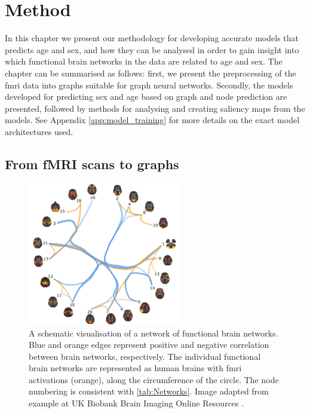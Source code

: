 \chapter{Method}
\label{chap:method}

In this chapter we present our methodology for developing accurate models that predicts age and sex, and how they can be analysed in order to gain insight into which functional brain networks in the data are related to age and sex. The chapter can be summarised as follows: first, we present the preprocessing of the \acrshort{fmri} data into graphs suitable for graph neural networks. Secondly, the models developed for predicting sex and age based on graph and node prediction are presented, followed by methods for analysing and creating saliency maps from the models. See Appendix \ref{app:model_training} for more details on the exact model architectures used. 

\section{From fMRI scans to graphs}\label{sec:fmri_to_graphs}

\begin{figure}[!htbp]
    \centering
    \includegraphics[width=0.6\textwidth]{chapters/images_methods/fmri_network_ukbiobank.png}
    \caption{A schematic visualisation of a network of functional brain networks. Blue and orange edges represent positive and negative correlation between brain networks, respectively.  The individual functional brain networks are represented as human brains with \acrshort{fmri} activations (orange), along the circumference of the circle. The node numbering is consistent with \cref{tab:Networks}. Image adapted from example at UK Biobank Brain Imaging Online Resources \cite{ukbiobank_brain_imaging}.}
    \label{fig:fmri_network}
\end{figure}

